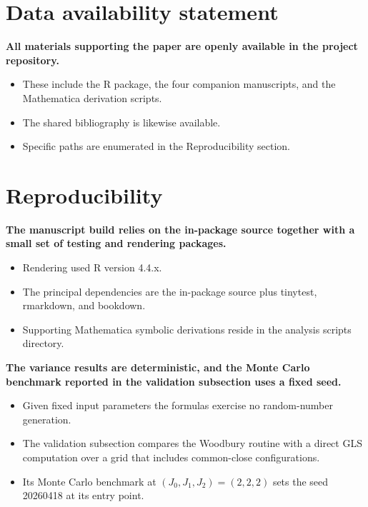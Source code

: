 \documentclass[
  11pt,
]{article}
\begin{document}
\section{Data availability statement}\label{data-availability-statement}

\textbf{All materials supporting the paper are openly available in the project repository.}

\begin{itemize}\setlength{\itemsep}{2pt}\setlength{\parskip}{0pt}
\item These include the R package, the four companion manuscripts, and the Mathematica derivation scripts.
\item The shared bibliography is likewise available.
\item Specific paths are enumerated in the Reproducibility section.
\end{itemize}

\section{Reproducibility}\label{reproducibility}

\textbf{The manuscript build relies on the in-package source together with a small set of testing and rendering packages.}

\begin{itemize}\setlength{\itemsep}{2pt}\setlength{\parskip}{0pt}
\item Rendering used R version 4.4.x.
\item The principal dependencies are the in-package source plus tinytest, rmarkdown, and bookdown.
\item Supporting Mathematica symbolic derivations reside in the analysis scripts directory.
\end{itemize}

\textbf{The variance results are deterministic, and the Monte Carlo benchmark reported in the validation subsection uses a fixed seed.}

\begin{itemize}\setlength{\itemsep}{2pt}\setlength{\parskip}{0pt}
\item Given fixed input parameters the formulas exercise no random-number generation.
\item The validation subsection compares the Woodbury routine with a direct GLS computation over a grid that includes common-close configurations.
\item Its Monte Carlo benchmark at $(J_0, J_1, J_2) = (2, 2, 2)$ sets the seed 20260418 at its entry point.
\end{itemize}
\end{document}
